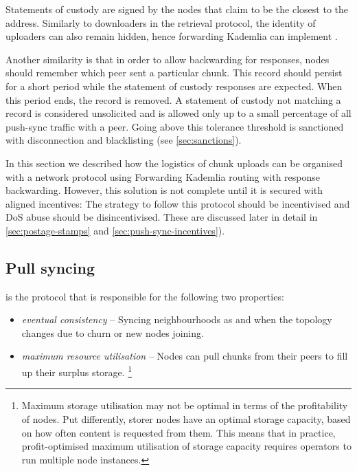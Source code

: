 Statements of custody are signed by the nodes that claim to be the closest to the address. 
Similarly to downloaders in the retrieval protocol, the identity of uploaders can also remain hidden, hence forwarding Kademlia can implement .

Another similarity is that in order to allow backwarding for responses, nodes should remember which peer sent a particular chunk. This record should persist for a short period while the statement of custody responses are expected. When this period ends, the record is removed. A statement of custody not matching a record is considered unsolicited and is allowed only up to a small percentage of all push-sync traffic with a peer. Going above this tolerance threshold is sanctioned with disconnection and blacklisting (see \ref{sec:sanctions}).

In this section we described how the logistics of chunk uploads can be organised with a network protocol using Forwarding Kademlia routing with response backwarding. However, this solution is not complete until it is secured with aligned incentives: The strategy to follow this protocol should be incentivised and DoS abuse should be disincentivised. These are discussed later in detail in \ref{sec:postage-stamps} and \ref{sec:push-sync-incentives}).

\subsection{Pull syncing\statusgreen}\label{sec:pull-syncing}

 is the protocol that is responsible for the following two properties: 

\begin{itemize}
    \item \emph{eventual consistency} -- Syncing neighbourhoods as and when the topology changes due to churn or new nodes joining.
    \item \emph{maximum resource utilisation} -- Nodes can pull chunks from their peers to fill up their surplus storage.%
%
\footnote{Maximum storage utilisation may not be optimal in terms of the profitability of nodes. Put differently, storer nodes have an optimal storage capacity, based on how often content is requested from them. This means that in practice, profit-optimised maximum utilisation of storage capacity requires operators to run multiple node instances.}
\end{itemize}

